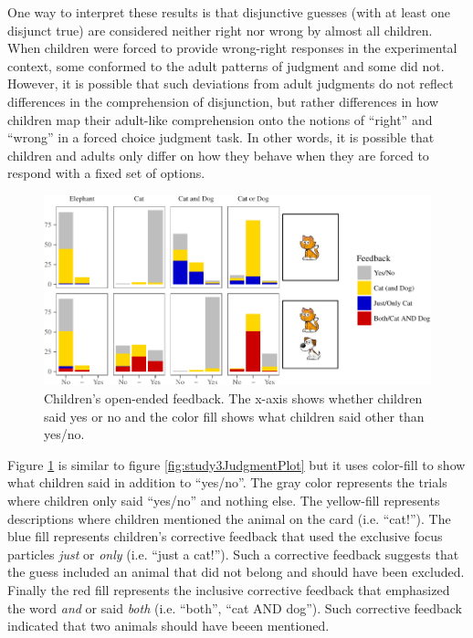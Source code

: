 \documentclass[oneside]{report}
\theoremstyle{definition}
\theoremstyle{definition}
\theoremstyle{definition}
\theoremstyle{remark}
\begin{document}
One way to interpret these results is that disjunctive guesses (with at
least one disjunct true) are considered neither right nor wrong by
almost all children. When children were forced to provide wrong-right
responses in the experimental context, some conformed to the adult
patterns of judgment and some did not. However, it is possible that such
deviations from adult judgments do not reflect differences in the
comprehension of disjunction, but rather differences in how children map
their adult-like comprehension onto the notions of ``right'' and
``wrong'' in a forced choice judgment task. In other words, it is
possible that children and adults only differ on how they behave when
they are forced to respond with a fixed set of options.
\begin{figure}[t]

{\centering \includegraphics{figs/feedbackFillPlot-1} 

}

\caption{Children's open-ended feedback. The x-axis shows whether children said yes or no and the color fill shows what children said other than yes/no.}\label{fig:feedbackFillPlot}
\end{figure}
Figure \ref{fig:feedbackFillPlot} is similar to figure
\ref{fig:study3JudgmentPlot} but it uses color-fill to show what
children said in addition to ``yes/no''. The gray color represents the
trials where children only said ``yes/no'' and nothing else. The
yellow-fill represents descriptions where children mentioned the animal
on the card (i.e. ``cat!''). The blue fill represents children's
corrective feedback that used the exclusive focus particles \emph{just}
or \emph{only} (i.e. ``just a cat!''). Such a corrective feedback
suggests that the guess included an animal that did not belong and
should have been excluded. Finally the red fill represents the inclusive
corrective feedback that emphasized the word \emph{and} or said
\emph{both} (i.e. ``both'', ``cat AND dog''). Such corrective feedback
indicated that two animals should have beeen mentioned.
\end{document}
